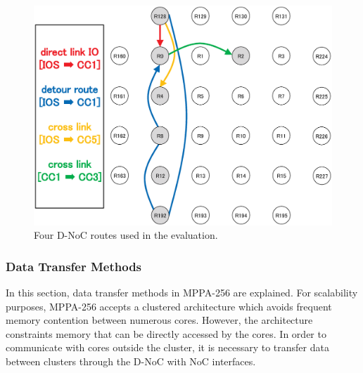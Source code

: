 \documentclass[conference,compsoc]{IEEEtran}
\newcommand{\comment}[1]{}
\begin{document}
\begin{figure}[t]
  \centering
  \includegraphics[width=0.8\linewidth]{../figure/noc_routes.eps}
  \vspace{-3mm}
  \caption{\label{fig:noc_routes}
    Four D-NoC routes used in the evaluation.}
  \vspace{-5mm}
\end{figure}

\vspace{-3mm}
\subsubsection{Data Transfer Methods}
\label{sec:data_transfer_methods}

\comment{TBD: 1-19: To be fully refleshed, Add setup and approach}
In this section, data transfer methods in MPPA-256 are explained.
For scalability purposes, MPPA-256 accepts a clustered architecture which avoids frequent memory contention between numerous cores.
However, the architecture constraints memory that can be directly accessed by the cores.
In order to communicate with cores outside the cluster, it is necessary to transfer data between clusters through the D-NoC with NoC interfaces.
\end{document}
